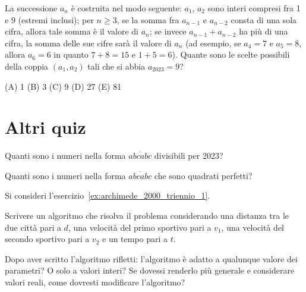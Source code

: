 \begin{esercizio}
    \label{ex:distrettuali_2023_9}
    La successione $a_n$ è costruita nel modo seguente:
    $a_1$, $a_2$ sono interi compresi fra 1 e 9 (estremi inclusi);
    per $n \ge 3$, se la somma fra $a_{n-1}$ e $a_{n-2}$ consta di una sola cifra, allora tale somma è il valore di $a_n$;
    se invece $a_{n-1} + a_{n-2}$ ha più di una cifra, la somma delle sue cifre sarà il valore di $a_n$
    (ad esempio, se $a_4 = 7$ e $a_5 = 8$, allora $a_6 = 6$ in quanto $7 + 8 = 15$ e $1 + 5 = 6$).
    Quante sono le scelte possibili della coppia $(a_1, a_2)$ tali che si abbia $a_{2023} = 9$?

    (A) 1 \quad (B) 3 \quad (C) 9 \quad (D) 27 \quad (E) 81
\end{esercizio}

\section{Altri quiz}
\label{sec:quiz_altri}

\begin{esercizio}
    \label{ex:francesco_1}
    Quanti sono i numeri nella forma $\overline{abcabc}$ divisibili per 2023?
\end{esercizio}

\begin{esercizio}
    \label{ex:francesco_2}
    Quanti sono i numeri nella forma $\overline{abcabc}$ che sono quadrati perfetti?
\end{esercizio}

\begin{esercizio}
    \label{ex:claudio_1}
    Si consideri l'esercizio~\ref{ex:archimede_2000_triennio_1}.

    Scrivere un algoritmo che risolva il problema considerando una distanza tra le due città pari a $d$, una velocità
    del primo sportivo pari a $v_1$, una velocità del secondo sportivo pari a $v_2$ e un tempo pari a $t$.

    Dopo aver scritto l'algoritmo rifletti: l'algoritmo è adatto a qualunque valore dei parametri?
    O solo a valori interi?
    Se dovessi renderlo più generale e considerare valori reali, come dovresti modificare l'algoritmo?
\end{esercizio}